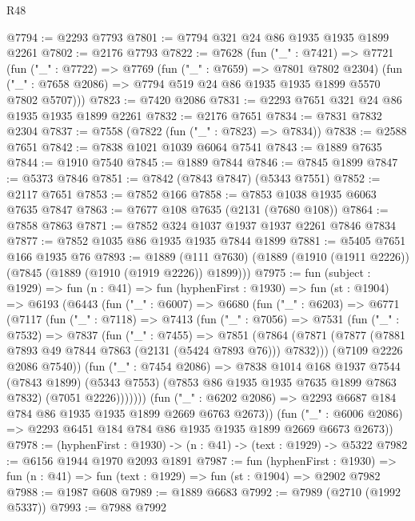 \begin{lexlean}{R48}
\begin{coremodule}
@7794 := @2293 @7793
@7801 := @7794 @321 @24 @86 @1935 @1935 @1899 @2261
@7802 := @2176 @7793
@7822 := @7628
    (fun ("_" : @7421) =>
    @7721
      (fun ("_" : @7722) =>
      @7769
        (fun ("_" : @7659) => @7801 @7802 @2304)
        (fun ("_" : @7658 @2086) => @7794 @519 @24 @86 @1935 @1935 @1899 @5570 @7802 @5707)))
@7823 := @7420 @2086
@7831 := @2293 @7651 @321 @24 @86 @1935 @1935 @1899 @2261
@7832 := @2176 @7651
@7834 := @7831 @7832 @2304
@7837 := @7558 (@7822 (fun ("_" : @7823) => @7834))
@7838 := @2588 @7651
@7842 := @7838 @1021 @1039 @6064 @7541
@7843 := @1889 @7635
@7844 := @1910 @7540
@7845 := @1889 @7844
@7846 := @7845 @1899
@7847 := @5373 @7846
@7851 := @7842 (@7843 @7847) (@5343 @7551)
@7852 := @2117 @7651
@7853 := @7852 @166
@7858 := @7853 @1038 @1935 @6063 @7635 @7847
@7863 := @7677 @108 @7635 (@2131 (@7680 @108))
@7864 := @7858 @7863
@7871 := @7852 @324 @1037 @1937 @1937 @2261 @7846 @7834
@7877 := @7852 @1035 @86 @1935 @1935 @7844 @1899
@7881 := @5405 @7651 @166 @1935 @76
@7893 := @1889
    (@111 @7630)
    (@1889 (@1910 (@1911 @2226)) (@7845 (@1889 (@1910 (@1919 @2226)) @1899)))
@7975 := fun (subject : @1929) =>
  fun (n : @41) =>
  fun (hyphenFirst : @1930) =>
  fun (st : @1904) =>
  @6193
    (@6443
      (fun ("_" : @6007) =>
      @6680
        (fun ("_" : @6203) =>
        @6771
          (@7117
            (fun ("_" : @7118) =>
            @7413
              (fun ("_" : @7056) =>
              @7531
                (fun ("_" : @7532) =>
                @7837
                  (fun ("_" : @7455) =>
                  @7851
                    (@7864
                      (@7871 (@7877 (@7881 @7893 @49 @7844 @7863 (@2131 (@5424 @7893 @76))) @7832)))
                    (@7109 @2226 @2086 @7540))
                  (fun ("_" : @7454 @2086) =>
                  @7838
                    @1014
                    @168
                    @1937
                    @7544
                    (@7843 @1899)
                    (@5343 @7553)
                    (@7853 @86 @1935 @1935 @7635 @1899 @7863 @7832)
                    (@7051 @2226)))))))
        (fun ("_" : @6202 @2086) => @2293 @6687 @184 @784 @86 @1935 @1935 @1899 @2669 @6763 @2673))
      (fun ("_" : @6006 @2086) => @2293 @6451 @184 @784 @86 @1935 @1935 @1899 @2669 @6673 @2673))
@7978 := (hyphenFirst : @1930) -> (n : @41) -> (text : @1929) -> @5322
@7982 := @6156 @1944 @1970 @2093 @1891
@7987 := fun (hyphenFirst : @1930) =>
  fun (n : @41) => fun (text : @1929) => fun (st : @1904) => @2902 @7982
@7988 := @1987 @608
@7989 := @1889 @6683
@7992 := @7989 (@2710 (@1992 @5337))
@7993 := @7988 @7992

\end{coremodule}
\end{lexlean}
